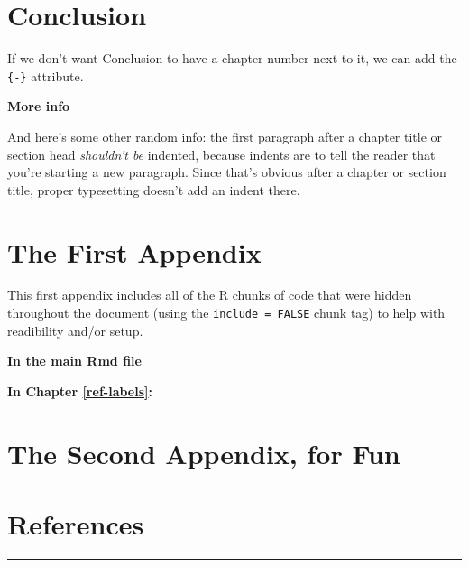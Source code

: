 \documentclass[11pt,oneside]{bristolthesis}
\begin{document}
\hypertarget{conclusion}{%
\chapter*{Conclusion}\label{conclusion}}

If we don't want Conclusion to have a chapter number next to it, we can add the \texttt{\{-\}} attribute.

\textbf{More info}

And here's some other random info: the first paragraph after a chapter title or section head \emph{shouldn't be} indented, because indents are to tell the reader that you're starting a new paragraph. Since that's obvious after a chapter or section title, proper typesetting doesn't add an indent there.

\appendix

\hypertarget{the-first-appendix}{%
\chapter{The First Appendix}\label{the-first-appendix}}

This first appendix includes all of the R chunks of code that were hidden throughout the document (using the \texttt{include\ =\ FALSE} chunk tag) to help with readibility and/or setup.

\textbf{In the main Rmd file}

\textbf{In Chapter \ref{ref-labels}:}

\hypertarget{the-second-appendix-for-fun}{%
\chapter{The Second Appendix, for Fun}\label{the-second-appendix-for-fun}}

\backmatter

\hypertarget{references}{%
\chapter*{References}\label{references}}


\noindent

\setlength{\parindent}{-0.20in}
\setlength{\leftskip}{0.20in}
\setlength{\parskip}{8pt}
\begin{center}\rule{0.5\linewidth}{0.5pt}\end{center}
\end{document}
